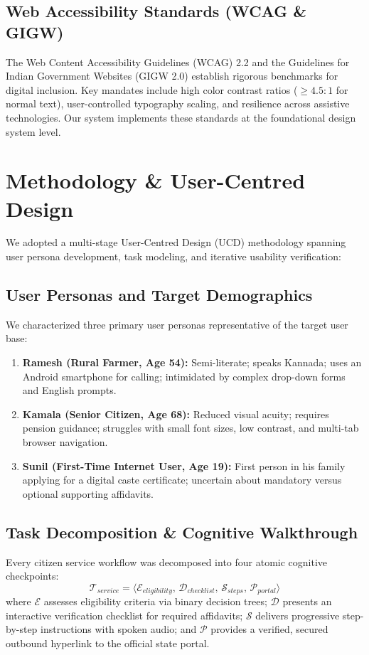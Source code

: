 \documentclass[conference]{IEEEtran}
\begin{document}
\subsection{Web Accessibility Standards (WCAG \& GIGW)}
The Web Content Accessibility Guidelines (WCAG) 2.2 \cite{wcag22} and the Guidelines for Indian Government Websites (GIGW 2.0) \cite{gigw2018} establish rigorous benchmarks for digital inclusion. Key mandates include high color contrast ratios ($\ge 4.5:1$ for normal text), user-controlled typography scaling, and resilience across assistive technologies. Our system implements these standards at the foundational design system level.

\section{Methodology \& User-Centred Design}
We adopted a multi-stage User-Centred Design (UCD) methodology \cite{hartson2012ux} spanning user persona development, task modeling, and iterative usability verification:

\subsection{User Personas and Target Demographics}
We characterized three primary user personas representative of the target user base:
\begin{enumerate}
    \item \textbf{Ramesh (Rural Farmer, Age 54):} Semi-literate; speaks Kannada; uses an Android smartphone for calling; intimidated by complex drop-down forms and English prompts.
    \item \textbf{Kamala (Senior Citizen, Age 68):} Reduced visual acuity; requires pension guidance; struggles with small font sizes, low contrast, and multi-tab browser navigation.
    \item \textbf{Sunil (First-Time Internet User, Age 19):} First person in his family applying for a digital caste certificate; uncertain about mandatory versus optional supporting affidavits.
\end{enumerate}

\subsection{Task Decomposition \& Cognitive Walkthrough}
Every citizen service workflow was decomposed into four atomic cognitive checkpoints:
\begin{equation}
\mathcal{T}_{service} = \langle \mathcal{E}_{eligibility},\, \mathcal{D}_{checklist},\, \mathcal{S}_{steps},\, \mathcal{P}_{portal} \rangle
\end{equation}
where $\mathcal{E}$ assesses eligibility criteria via binary decision trees; $\mathcal{D}$ presents an interactive verification checklist for required affidavits; $\mathcal{S}$ delivers progressive step-by-step instructions with spoken audio; and $\mathcal{P}$ provides a verified, secured outbound hyperlink to the official state portal.
\end{document}
